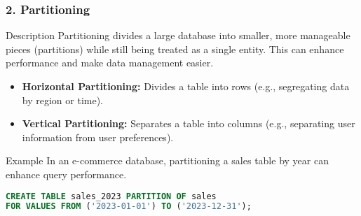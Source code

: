 \documentclass{beamer}
\begin{document}
\begin{frame}[fragile]
    \frametitle{2. Partitioning}
    \begin{block}{Description}
        Partitioning divides a large database into smaller, more manageable pieces (partitions) while still being treated as a single entity. This can enhance performance and make data management easier.
    \end{block}
    
    \begin{itemize}
        \item \textbf{Horizontal Partitioning:} Divides a table into rows (e.g., segregating data by region or time).
        \item \textbf{Vertical Partitioning:} Separates a table into columns (e.g., separating user information from user preferences).
    \end{itemize}
    
    \begin{block}{Example}
        In an e-commerce database, partitioning a sales table by year can enhance query performance.
    \end{block}

    \begin{lstlisting}[language=SQL]
CREATE TABLE sales_2023 PARTITION OF sales
FOR VALUES FROM ('2023-01-01') TO ('2023-12-31');
    \end{lstlisting}
\end{frame}
\end{document}
